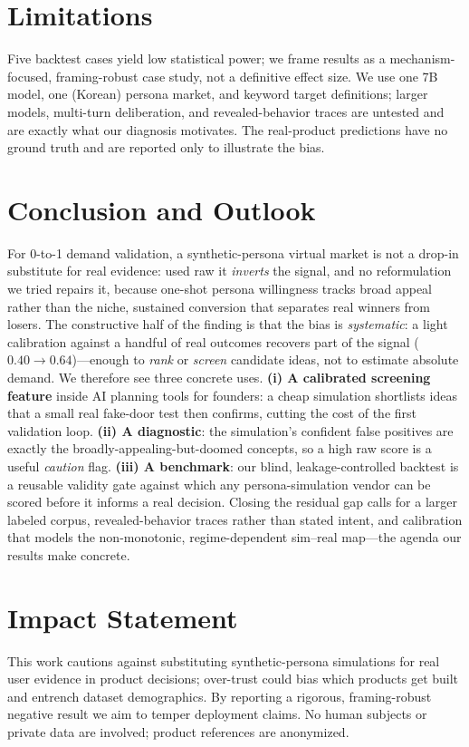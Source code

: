 \documentclass{article}
\begin{document}
\section{Limitations}
\label{sec:limits}
Five backtest cases yield low statistical power; we frame results as a
mechanism-focused, framing-robust case study, not a definitive effect size. We use
one 7B model, one (Korean) persona market, and keyword target definitions; larger
models, multi-turn deliberation, and revealed-behavior traces are untested and are
exactly what our diagnosis motivates. The real-product predictions have no ground
truth and are reported only to illustrate the bias.

\section{Conclusion and Outlook}
\label{sec:conclusion}
For 0-to-1 demand validation, a synthetic-persona virtual market is not a drop-in
substitute for real evidence: used raw it \emph{inverts} the signal, and no
reformulation we tried repairs it, because one-shot persona willingness tracks
broad appeal rather than the niche, sustained conversion that separates real
winners from losers. The constructive half of the finding is that the bias is
\emph{systematic}: a light calibration against a handful of real outcomes recovers
part of the signal ($0.40\rightarrow0.64$)---enough to \emph{rank} or \emph{screen}
candidate ideas, not to estimate absolute demand. We therefore see three concrete
uses. \textbf{(i) A calibrated screening feature} inside AI planning tools for founders:
a cheap simulation shortlists ideas that a small real fake-door test then confirms,
cutting the cost of the first validation loop.
\textbf{(ii) A diagnostic}: the simulation's confident false positives are exactly
the broadly-appealing-but-doomed concepts, so a high raw score is a useful
\emph{caution} flag. \textbf{(iii) A benchmark}: our blind, leakage-controlled
backtest is a reusable validity gate against which any persona-simulation vendor
can be scored before it informs a real decision. Closing the residual gap calls for
a larger labeled corpus, revealed-behavior traces rather than stated intent, and
calibration that models the non-monotonic, regime-dependent sim--real map---the
agenda our results make concrete.

\section*{Impact Statement}
This work cautions against substituting synthetic-persona simulations for real
user evidence in product decisions; over-trust could bias which products get built
and entrench dataset demographics. By reporting a rigorous, framing-robust negative
result we aim to temper deployment claims. No human subjects or private data are
involved; product references are anonymized.
\end{document}
